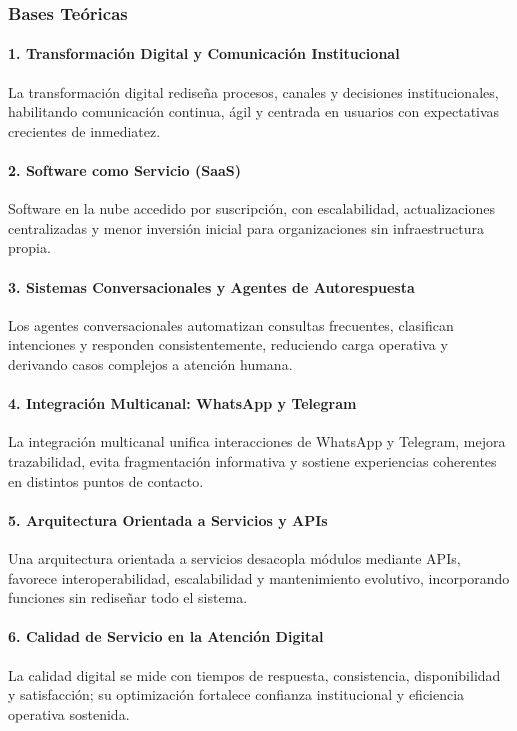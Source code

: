 \subsubsection{Bases Teóricas}

\paragraph{1. Transformación Digital y Comunicación Institucional}
La transformación digital rediseña procesos, canales y decisiones institucionales, habilitando comunicación continua, ágil y centrada en usuarios con expectativas crecientes de inmediatez.

\paragraph{2. Software como Servicio (SaaS)}
Software en la nube accedido por suscripción, con escalabilidad, actualizaciones centralizadas y menor inversión inicial para organizaciones sin infraestructura propia.

\paragraph{3. Sistemas Conversacionales y Agentes de Autorespuesta}
Los agentes conversacionales automatizan consultas frecuentes, clasifican intenciones y responden consistentemente, reduciendo carga operativa y derivando casos complejos a atención humana.

\paragraph{4. Integración Multicanal: WhatsApp y Telegram}
La integración multicanal unifica interacciones de WhatsApp y Telegram, mejora trazabilidad, evita fragmentación informativa y sostiene experiencias coherentes en distintos puntos de contacto.

\paragraph{5. Arquitectura Orientada a Servicios y APIs}
Una arquitectura orientada a servicios desacopla módulos mediante APIs, favorece interoperabilidad, escalabilidad y mantenimiento evolutivo, incorporando funciones sin rediseñar todo el sistema.

\paragraph{6. Calidad de Servicio en la Atención Digital}
La calidad digital se mide con tiempos de respuesta, consistencia, disponibilidad y satisfacción; su optimización fortalece confianza institucional y eficiencia operativa sostenida.

